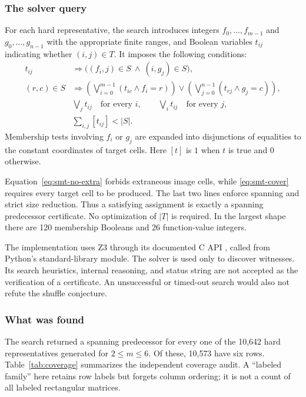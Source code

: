 \documentclass[11pt,letterpaper]{article}
\numberwithin{equation}{section}
\theoremstyle{definition}
\theoremstyle{remark}
\newcommand{\code}[1]{\texttt{\detokenize{#1}}}
\begin{document}
\subsubsection{The solver query}
For each hard representative, the search introduces integers
$f_0,\ldots,f_{m-1}$ and $g_0,\ldots,g_{n-1}$ with the appropriate finite
ranges, and Boolean variables $t_{ij}$ indicating whether $(i,j)\in T$.
It imposes the following conditions:
\begin{align}
 t_{ij}&\Longrightarrow
       \bigl((f_i,j)\in S\ \land\ (i,g_j)\in S\bigr),
       \label{eq:smt-no-extra}\\
 (r,c)\in S&\Longrightarrow
 \left(\bigvee_{i=0}^{m-1}(t_{ic}\land f_i=r)\right)
 \lor
 \left(\bigvee_{j=0}^{n-1}(t_{rj}\land g_j=c)\right),
       \label{eq:smt-cover}\\
 &\bigvee_jt_{ij}\quad\text{for every }i,\qquad
   \bigvee_it_{ij}\quad\text{for every }j,
       \label{eq:smt-span}\\
 &\sum_{i,j}[t_{ij}]<|S|.
       \label{eq:smt-card}
\end{align}
Membership tests involving $f_i$ or $g_j$ are expanded into disjunctions
of equalities to the constant coordinates of target cells. Here $[t]$ is
$1$ when $t$ is true and $0$ otherwise.

Equation~\eqref{eq:smt-no-extra} forbids extraneous image cells, while
\eqref{eq:smt-cover} requires every target cell to be produced. The last
two lines enforce spanning and strict size reduction. Thus a satisfying
assignment is exactly a spanning predecessor certificate. No optimization
of $|T|$ is required. In the largest shape there are 120 membership
Booleans and 26 function-value integers.

The implementation uses Z3 through its documented C API
\cite{Z3API}, called from Python's standard-library \code{ctypes} module.
The solver is used only to discover witnesses. Its search heuristics,
internal reasoning, and status string are not accepted as the verification
of a certificate. An unsuccessful or timed-out search would also not
refute the shuffle conjecture.

\subsubsection{What was found}
The search returned a spanning predecessor for every one of the 10,642
hard representatives generated for $2\le m\le6$. Of these, 10,573 have six
rows. Table~\ref{tab:coverage} summarizes the independent coverage audit.
A ``labeled family'' here retains row labels but forgets column ordering;
it is not a count of all labeled rectangular matrices.
\end{document}
